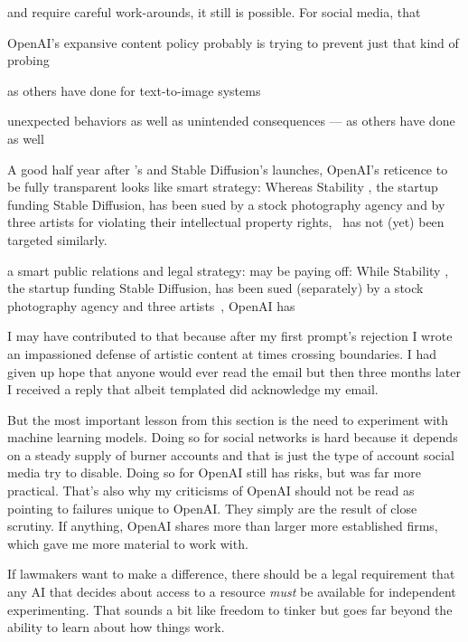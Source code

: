{and require careful work-arounds, it
still is possible. For social media, that



OpenAI's
expansive content policy probably is trying to prevent just that kind of
probing


as
others have done for text-to-image systems


unexpected behaviors as well as unintended consequences --- as
others have done as well~\cite{BirhanePrabhuea2021,CarliniHayesea2023}



A good half year after \DALLE's and Stable Diffusion's launches, OpenAI's
reticence to be fully transparent looks like smart strategy: Whereas Stability
\AI, the startup funding Stable Diffusion, has been sued by a stock photography
agency and by three artists for violating their intellectual property rights,
\DALLE\ has not (yet) been targeted similarly.

a smart public relations and
legal strategy:  may be paying off: While Stability \AI, the
startup funding Stable Diffusion, has been sued (separately) by a stock
photography agency and three artists~\cite{Butterick2023,Setty2023,Vincent2023},
OpenAI has



I may have contributed to that because after my first prompt's rejection I wrote
an impassioned defense of artistic content at times crossing boundaries. I had
given up hope that anyone would ever read the email but then three months later
I received a reply that albeit templated did acknowledge my email.


But the most important lesson from this section is the need to experiment with
machine learning models. Doing so for social networks is hard because it depends
on a steady supply of burner accounts and that is just the type of account
social media try to disable. Doing so for OpenAI still has risks, but was far
more practical. That's also why my criticisms of OpenAI should not be read as
pointing to failures unique to OpenAI. They simply are the result of close
scrutiny. If anything, OpenAI shares more than larger more established firms,
which gave me more material to work with.

If lawmakers want to make a difference, there should be a legal requirement that
any AI that decides about access to a resource \emph{must} be available for
independent experimenting. That sounds a bit like freedom to tinker but goes far
beyond the ability to learn about how things work.


}
